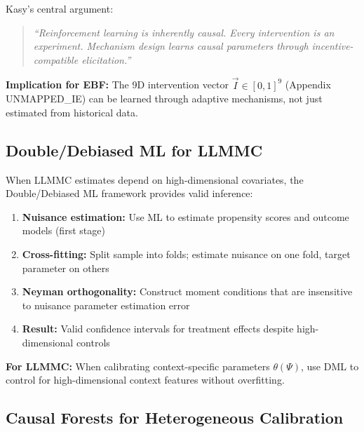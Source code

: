 \begin{tcolorbox}[colback=yellow!5!white, colframe=yellow!75!black,
    title=Key Insight: Causality $\Leftrightarrow$ Decision]

Kasy's central argument:
\begin{quote}
\emph{``Reinforcement learning is inherently causal. Every intervention is an experiment.
Mechanism design learns causal parameters through incentive-compatible elicitation.''}
\end{quote}

\textbf{Implication for EBF:} The 9D intervention vector $\vec{I} \in [0,1]^9$
(Appendix UNMAPPED_IE) can be learned through adaptive mechanisms, not just estimated from
historical data.
\end{tcolorbox}

\subsection{Double/Debiased ML for LLMMC}

When LLMMC estimates depend on high-dimensional covariates, the Double/Debiased ML
framework \citep{chernozhukov2018double} provides valid inference:

\begin{enumerate}
\item \textbf{Nuisance estimation:} Use ML to estimate propensity scores and
outcome models (first stage)

\item \textbf{Cross-fitting:} Split sample into folds; estimate nuisance on
one fold, target parameter on others

\item \textbf{Neyman orthogonality:} Construct moment conditions that are
insensitive to nuisance parameter estimation error

\item \textbf{Result:} Valid confidence intervals for treatment effects despite
high-dimensional controls
\end{enumerate}

\textbf{For LLMMC:} When calibrating context-specific parameters $\theta(\Psi)$,
use DML to control for high-dimensional context features without overfitting.

\subsection{Causal Forests for Heterogeneous Calibration}


